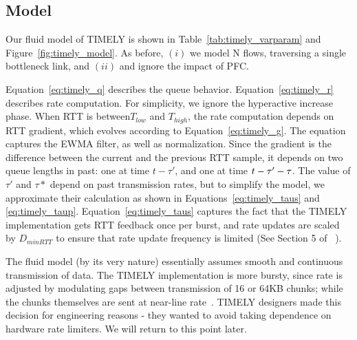 \subsection{Model}

Our fluid model of TIMELY is shown in Table~\ref{tab:timely_varparam} and
Figure~\ref{fig:timely_model}. As before, $(i)$ we model N flows, traversing a
single bottleneck link, and $(ii)$ and ignore the impact of PFC. 

Equation~\ref{eq:timely_q} describes the queue behavior.
Equation~\ref{eq:timely_r} describes rate computation. For simplicity, we ignore
the hyperactive increase phase. When RTT is between$T_{low}$ and $T_{high}$, the
rate computation depends on RTT gradient, which evolves according to
Equation~\ref{eq:timely_g}.  The equation captures the EWMA filter, as well as
normalization. Since the gradient is the difference between the current and the
previous RTT sample, it depends on two queue lengths in past: one at time $t -
\tau'$, and one at time $t - \tau'-\tau\*$. The value of $\tau'$ and $\tau*$
depend on past transmission rates, but to simplify the model, we approximate
their calculation as shown in Equations~\ref{eq:timely_taus} and
\ref{eq:timely_taup}.  Equation~\ref{eq:timely_taus} captures the fact that the
TIMELY implementation gets RTT feedback once per burst, and rate updates are
scaled by $D_{minRTT}$ to ensure that rate update frequency is limited (See
Section 5 of ~\cite{timely}).

The fluid model (by its very nature) essentially assumes smooth and continuous
transmission of data. The TIMELY implementation is more bursty, since rate is
adjusted by modulating gaps between transmission of 16 or 64KB chunks; while the
chunks themselves are sent at near-line rate~\cite{timely}.  TIMELY
designers made this decision for engineering reasons - they wanted to avoid
taking dependence on hardware rate limiters.  We will return to this point
later.

